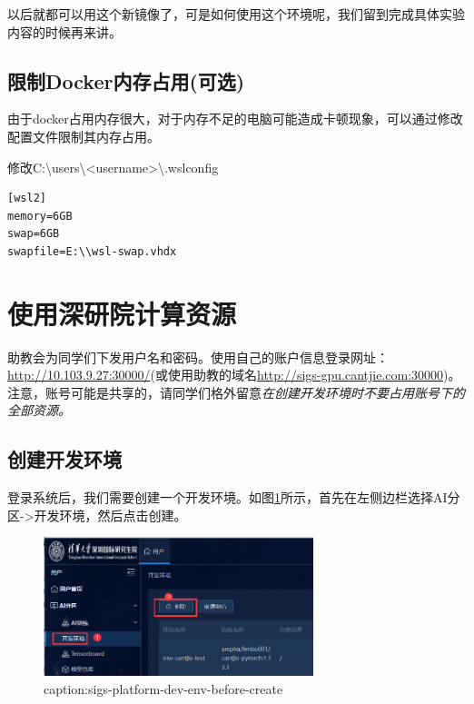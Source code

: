 以后就都可以用这个新镜像了，可是如何使用这个环境呢，我们留到完成具体实验内容的时候再来讲。

\subsection{限制Docker内存占用(可选)}

由于docker占用内存很大，对于内存不足的电脑可能造成卡顿现象，可以通过修改配置文件限制其内存占用。

修改C:\textbackslash users\textbackslash<username>\textbackslash .wslconfig 

\begin{lstlisting}
[wsl2]
memory=6GB
swap=6GB
swapfile=E:\\wsl-swap.vhdx
\end{lstlisting}





\section{使用深研院计算资源}\label{sec:env-setup-sigs-resources}


助教会为同学们下发用户名和密码。使用自己的账户信息登录网址：\url{http://10.103.9.27:30000/}(或使用助教的域名\url{http://sigs-gpu.cantjie.com:30000})。注意，账号可能是共享的，请同学们格外留意\emph{在创建开发环境时不要占用账号下的全部资源。}

\subsection{创建开发环境}

登录系统后，我们需要创建一个开发环境。如图\ref{fig:sigs-platform-dev-env-before-create}所示，首先在左侧边栏选择AI分区->开发环境，然后点击创建。

\begin{figure}[htbp]
	\centering
	\includegraphics[width=0.7\textwidth]{figures/sigs-platform-dev-env-before-create.png}
	\caption{caption:sigs-platform-dev-env-before-create}
	\label{fig:sigs-platform-dev-env-before-create}
\end{figure}

